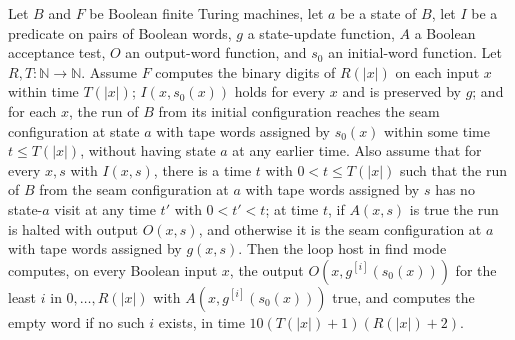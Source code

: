 \begin{theorem}
\label{Turing.FinTM.loopHostTM_finds}
\leanok
{}
Let $B$ and $F$ be Boolean finite Turing machines, let $a$ be a state of $B$, let $I$ be
a predicate on pairs of Boolean words, $g$ a state-update function, $A$ a Boolean
acceptance test, $O$ an output-word function, and $s_0$ an initial-word function. Let
$R,T:\mathbb{N}\to\mathbb{N}$. Assume $F$ computes the binary digits of $R(|x|)$ on each
input $x$ within time $T(|x|)$; $I(x,s_0(x))$ holds for every $x$ and is preserved by
$g$; and for each $x$, the run of $B$ from its initial configuration reaches the seam
configuration at state $a$ with tape words assigned by $s_0(x)$ within some time $t\le
T(|x|)$, without having state $a$ at any earlier time. Also assume that for every $x,s$
with $I(x,s)$, there is a time $t$ with $0<t\le T(|x|)$ such that the run of $B$ from
the seam configuration at $a$ with tape words assigned by $s$ has no state-$a$ visit at
any time $t'$ with $0<t'<t$; at time $t$, if $A(x,s)$ is true the run is halted with
output $O(x,s)$, and otherwise it is the seam configuration at $a$ with tape words
assigned by $g(x,s)$. Then the loop host in find mode computes, on every Boolean input
$x$, the output $O(x,g^{[i]}(s_0(x)))$ for the least $i$ in $0,\ldots,R(|x|)$ with
$A(x,g^{[i]}(s_0(x)))$ true, and computes the empty word if no such $i$ exists, in time
$10(T(|x|)+1)(R(|x|)+2)$.
\end{theorem}

